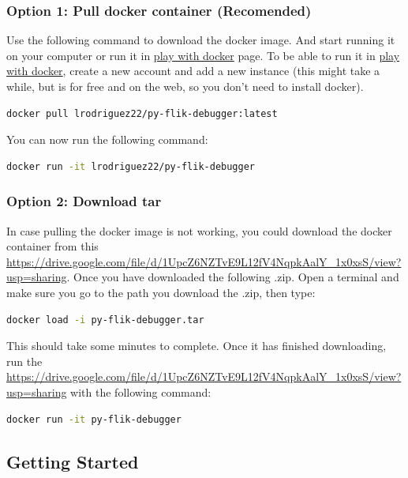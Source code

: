 \subsubsection{Option 1: Pull docker container (Recomended)}

Use the following command to download the docker image. And start running it on your computer or run it 
in \href{https://labs.play-with-docker.com/}{play with docker} page. To be able to run it in 
\href{https://labs.play-with-docker.com/}{play with docker}, create a new account and add a new instance 
(this might take a while, but is for free and on the web, so you don’t need to install docker).

\begin{lstlisting}[language=bash]
docker pull lrodriguez22/py-flik-debugger:latest
\end{lstlisting}

You can now run the following command:

\begin{lstlisting}[language=bash]
docker run -it lrodriguez22/py-flik-debugger
\end{lstlisting}

\subsubsection{Option 2: Download tar}
In case pulling the docker image is not working, you could download the docker container from this 
\href{docker container}{https://drive.google.com/file/d/1UpcZ6NZTvE9L12fV4NqpkAalY\_1x0xsS/view?usp=sharing}. 
Once you have downloaded the following .zip. Open a terminal and make sure you go to the path you download 
the .zip, then type:

\begin{lstlisting}[language=bash]
docker load -i py-flik-debugger.tar
\end{lstlisting}

This should take some minutes to complete. Once it has finished downloading, run the 
\href{docker container}{https://drive.google.com/file/d/1UpcZ6NZTvE9L12fV4NqpkAalY\_1x0xsS/view?usp=sharing} 
with the following command:

\begin{lstlisting}[language=bash]
docker run -it py-flik-debugger
\end{lstlisting}

\subsection{Getting Started}
